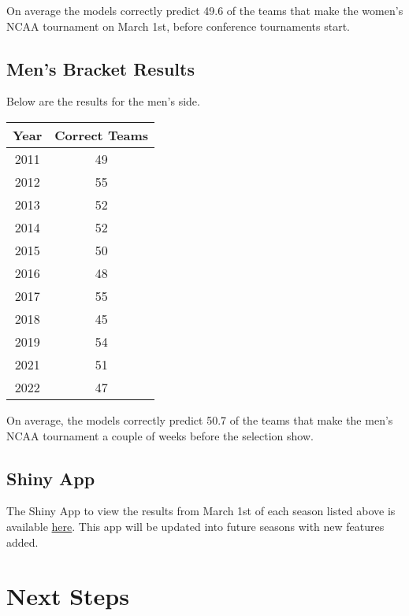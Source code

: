 \documentclass{article}
\begin{document}
On average the models correctly predict 49.6 of the teams that make the women's NCAA tournament on March 1st, before conference tournaments start.

\subsection{Men's Bracket Results}

Below are the results for the men's side.

\begin{center}
\begin{tabular} {c | c}
Year  & Correct Teams \\
\hline
2011 & 49 \\
2012 & 55 \\
2013 & 52 \\
2014 & 52 \\
2015 & 50 \\
2016 & 48 \\
2017 & 55 \\
2018 & 45 \\
2019 & 54 \\
2021 & 51 \\
2022 & 47
\end{tabular}
\end{center}

On average, the models correctly predict 50.7 of the teams that make the men's NCAA tournament a couple of weeks before the selection show.

\subsection{Shiny App}

The Shiny App to view the results from March 1st of each season listed above is available \href{https://michaelegle.shinyapps.io/michael-egle-bracketology/}{here}. This app will be updated into future seasons with new features added.

\section{Next Steps}
\end{document}
